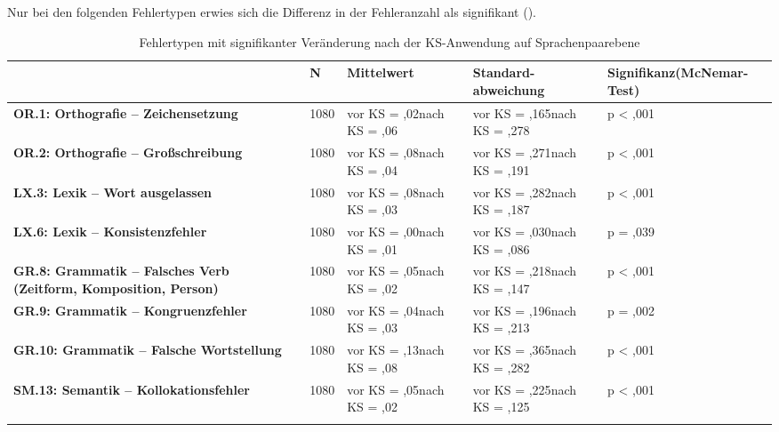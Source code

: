 Nur bei den folgenden Fehlertypen erwies sich die Differenz in der Fehleranzahl als signifikant ().

\begin{table}
\begin{tabularx}{\textwidth}{QlYYY}
\lsptoprule
 & \textbf{N} & \textbf{Mittelwert} & \textbf{Standard-abweichung} & { \textbf{Signifikanz}}\newline  \textbf{(McNemar-Test)}\\
\midrule
\textbf{OR.1: Orthografie -- Zeichensetzung} & 1080 & { vor KS = ,02}\newline  nach KS = ,06 & { vor KS = ,165}\newline  nach KS = ,278 & p < ,001\\
\textbf{OR.2: Orthografie -- Großschreibung} & 1080 & { vor KS = ,08}\newline nach KS = ,04 & { vor KS = ,271}\newline nach KS = ,191 & p < ,001\\
\textbf{LX.3: Lexik -- Wort ausgelassen} & 1080 & { vor KS = ,08}\newline nach KS = ,03 & { vor KS = ,282}\newline nach KS = ,187 & p < ,001\\
\textbf{LX.6: Lexik -- Konsistenzfehler} & 1080 & { vor KS = ,00}\newline nach KS = ,01 & { vor KS = ,030}\newline nach KS = ,086 & p = ,039\\
\textbf{GR.8: Grammatik -- Falsches Verb (Zeitform, Komposition, Person)} & 1080 & { vor KS = ,05}\newline nach KS = ,02 & { vor KS = ,218}\newline nach KS = ,147 & p < ,001\\
\textbf{GR.9: Grammatik -- Kongruenzfehler} & 1080 & { vor KS = ,04}\newline nach KS = ,03 & { vor KS = ,196}\newline nach KS = ,213 & p = ,002\\
\textbf{GR.10: Grammatik -- Falsche Wortstellung} & 1080 & { vor KS = ,13}\newline nach KS = ,08 & { vor KS = ,365}\newline nach KS = ,282 & p < ,001\\
\textbf{SM.13: Semantik -- Kollokationsfehler} & 1080 & { vor KS = ,05}\newline nach KS = ,02 & { vor KS = ,225}\newline nach KS = ,125 & p < ,001\\
\lspbottomrule
\end{tabularx}
\caption{\label{tab:05:19} Fehlertypen mit signifikanter Veränderung nach der KS-Anwendung auf Sprachenpaarebene}
\end{table}

